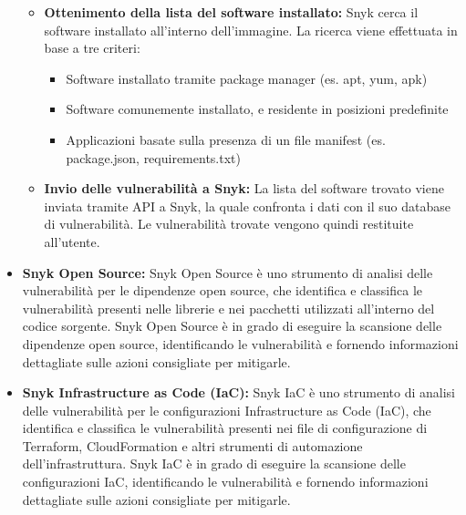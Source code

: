 \begin{itemize}
\begin{itemize}
            \item \textbf{Ottenimento della lista del software installato:} Snyk cerca il software installato all'interno dell'immagine. La ricerca viene effettuata in base a tre criteri:
                  \begin{itemize}
                     \item Software installato tramite package manager (es. apt, yum, apk)
                     \item Software comunemente installato, e residente in posizioni predefinite
                     \item Applicazioni basate sulla presenza di un file manifest (es. package.json, requirements.txt)
                  \end{itemize}
            \item \textbf{Invio delle vulnerabilità a Snyk:} La lista del software trovato viene inviata tramite API a Snyk, la quale confronta i dati con il suo database di vulnerabilità. Le vulnerabilità trovate vengono quindi restituite all'utente.
         \end{itemize}
   \item \textbf{Snyk Open Source:} Snyk Open Source è uno strumento di analisi delle vulnerabilità per le dipendenze open source, che identifica e classifica le vulnerabilità presenti nelle librerie e nei pacchetti utilizzati all'interno del codice sorgente. Snyk Open Source è in grado di eseguire la scansione delle dipendenze open source, identificando le vulnerabilità e fornendo informazioni dettagliate sulle azioni consigliate per mitigarle.
   \item \textbf{Snyk Infrastructure as Code (IaC):} Snyk IaC è uno strumento di analisi delle vulnerabilità per le configurazioni Infrastructure as Code (IaC), che identifica e classifica le vulnerabilità presenti nei file di configurazione di Terraform, CloudFormation e altri strumenti di automazione dell'infrastruttura. Snyk IaC è in grado di eseguire la scansione delle configurazioni IaC, identificando le vulnerabilità e fornendo informazioni dettagliate sulle azioni consigliate per mitigarle.
\end{itemize}
